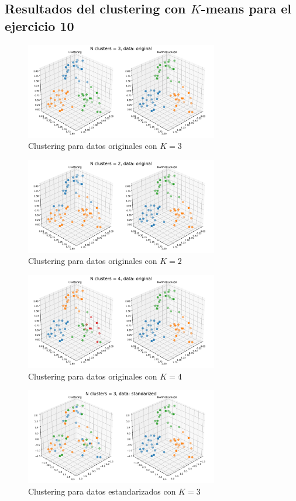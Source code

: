 \documentclass[11pt]{article}
\begin{document}
\subsection*{Resultados del clustering con $K$-means para el ejercicio 10}
\begin{figure}[H]
    \centering
    \includegraphics[width = 0.75\textwidth]{3-original-3.pdf}
    \caption{Clustering para datos originales con $K =3$}
    \label{3-original-3}
\end{figure}
\begin{figure}[H]
    \centering
    \includegraphics[width = 0.75\textwidth]{3-original-2.pdf}
    \caption{Clustering para datos originales con $K =2$}
    \label{3-original-2}
\end{figure}
\begin{figure}[H]
    \centering
    \includegraphics[width = 0.75\textwidth]{3-original-4.pdf}
    \caption{Clustering para datos originales con $K =4$}
    \label{3-original-4}
\end{figure}
\begin{figure}[H]
    \centering
    \includegraphics[width = 0.75\textwidth]{3-standarized-3.pdf}
    \caption{Clustering para datos estandarizados con $K = 3$}
    \label{3-standarized-3}
\end{figure}
\end{document}
